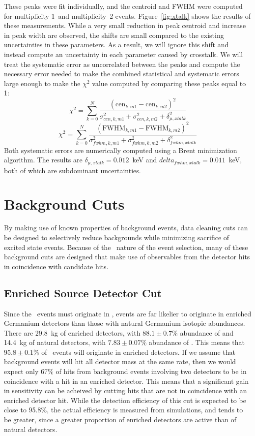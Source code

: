 \documentclass[/main.tex]{subfiles}
\begin{document}
These peaks were fit individually, and the centroid and FWHM were computed for multiplicity 1~and multiplicity~2 events.
Figure~\ref{fig:xtalk} shows the results of these measurements.
While a very small reduction in peak centroid and increase in peak width are observed, the shifts are small compared to the existing uncertainties in these parameters.
As a result, we will ignore this shift and instead compute an uncertainty in each parameter caused by crosstalk.
We will treat the systematic error as uncorrelated between the peaks and compute the necessary error needed to make the combined statistical and systematic errors large enough to make the $\chi^2$ value computed by comparing these peaks equal to 1:
\begin{equation}
  \chi^2 = \displaystyle\sum_{k=0}^N \frac{(\mathrm{cen}_{k,m1} - \mathrm{cen}_{k,m2})^2}{\sigma_{cen,k,m1}^2+\sigma_{cen,k,m2}^2+\delta_{\mu,xtalk}^2}
\end{equation}
\begin{equation}
  \chi^2 = \displaystyle\sum_{k=0}^N \frac{(\mathrm{FWHM}_{k,m1} - \mathrm{FWHM}_{k,m2})^2}{\sigma_{fwhm,k,m1}^2+\sigma_{fwhm,k,m2}^2+\delta_{fwhm,xtalk}^2}
\end{equation}
Both systematic errors are numerically computed using a Brent minimization algorithm.
The results are $\delta_{\mu,xtalk}=0.012$~keV and $delta_{fwhm,xtalk}=0.011$~keV, both of which are subdominant uncertainties.


\section{Background Cuts}
By making use of known properties of background events, data cleaning cuts can be designed to selectively reduce backgrounds while minimizing sacrifice of excited state events.
Because of the \md\ nature of the event selection, many of these background cuts are designed that make use of observables from the detector hits in coincidence with candidate hits.

\subsection{Enriched Source Detector Cut}
Since the \bbes\ events must originate in , events are far likelier to originate in enriched Germanium detectors than those with natural Germanium isotopic abundances.
There are 29.8~kg of enriched detectors, with $88.1 \pm 0.7$\% abundance of  and 14.4~kg of natural detectors, with $7.83 \pm 0.07$\% abundance of .
This means that $95.8 \pm 0.1$\% of \bbes\ events will originate in enriched detectors.
If we assume that background events will hit all detector mass at the same rate, then we would expect only 67\% of hits from background events involving two detectors to be in coincidence with a hit in an enriched detector.
This means that a significant gain in sensitivity can be acheived by cutting hits that are not in coincidence with an enriched detector hit.
While the detection efficiency of this cut is expected to be close to 95.8\%, the actual efficiency is measured from simulations, and tends to be greater, since a greater proportion of enriched detectors are active than of natural detectors.
\end{document}
